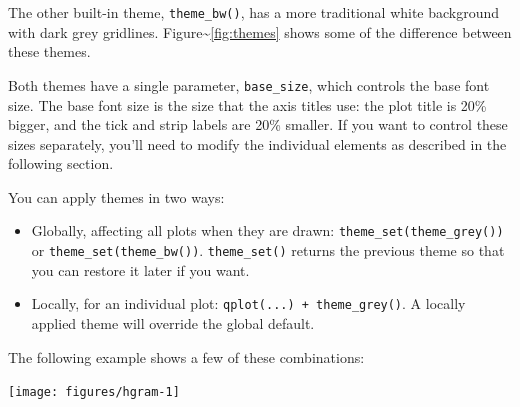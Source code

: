 The other built-in theme, \texttt{theme\_bw()}, has a more traditional
white background with dark grey gridlines.
Figure\textasciitilde{}\ref{fig:themes} shows some of the difference
between these themes. 
 

Both themes have a single parameter, \texttt{base\_size}, which controls
the base font size. The base font size is the size that the axis titles
use: the plot title is 20\% bigger, and the tick and strip labels are
20\% smaller. If you want to control these sizes separately, you'll need
to modify the individual elements as described in the following section.

You can apply themes in two ways:

\begin{itemize}
\itemsep1pt\parskip0pt
\item
  Globally, affecting all plots when they are drawn:
  \texttt{theme\_set(theme\_grey())} or
  \texttt{theme\_set(theme\_bw())}. \texttt{theme\_set()} returns the
  previous theme so that you can restore it later if you want.
\item
  Locally, for an individual plot: \texttt{qplot(...) + theme\_grey()}.
  A locally applied theme will override the global default.
\end{itemize}

\noindent The following example shows a few of these combinations:

\begin{Shaded}
\begin{Highlighting}[]
\NormalTok{>}\StringTok{ }\StringTok{ }  \NormalTok{)}
\NormalTok{>}\StringTok{ }
\ErrorTok{>}\StringTok{ }
\ErrorTok{>}\StringTok{ }
\ErrorTok{>}\StringTok{ }
\end{Highlighting}
\end{Shaded}

\begin{flushleft}\texttt{[image: figures/hgram-1]} \end{flushleft}

\begin{Shaded}
\begin{Highlighting}[]
\NormalTok{>}\StringTok{ }\StringTok{ }\NormalTok{(}\NormalTok{())}
\NormalTok{>}\StringTok{ }
\end{Highlighting}
\end{Shaded}

